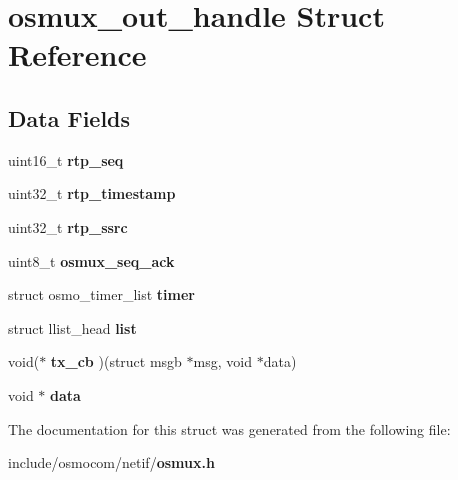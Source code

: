\section{osmux\+\_\+out\+\_\+handle Struct Reference}
\label{structosmux__out__handle}
\subsection*{Data Fields}
\begin{DoxyCompactItemize}
\item 
uint16\+\_\+t {\bfseries rtp\+\_\+seq}\label{structosmux__out__handle_aee1bdb3d46a66d0b153a423f53a83880}

\item 
uint32\+\_\+t {\bfseries rtp\+\_\+timestamp}\label{structosmux__out__handle_a15fd8367e4a22c0f47a5b331efb6d7e5}

\item 
uint32\+\_\+t {\bfseries rtp\+\_\+ssrc}\label{structosmux__out__handle_a3096fae9b4391ff0754406c8e4545653}

\item 
uint8\+\_\+t {\bfseries osmux\+\_\+seq\+\_\+ack}\label{structosmux__out__handle_aa44bc279d52ce909c02c3f26c104fe39}

\item 
struct osmo\+\_\+timer\+\_\+list {\bfseries timer}\label{structosmux__out__handle_aeb2a82bcffb2e94fe238779d7bfe24af}

\item 
struct llist\+\_\+head {\bfseries list}\label{structosmux__out__handle_a0127194adc4acf055bfb5bf656175cea}

\item 
void($\ast$ {\bfseries tx\+\_\+cb} )(struct msgb $\ast$msg, void $\ast$data)\label{structosmux__out__handle_a6995e0db09de16551070a1a6e4421f82}

\item 
void $\ast$ {\bfseries data}\label{structosmux__out__handle_af25716a02d38f2d33c922cfbe0c170f2}

\end{DoxyCompactItemize}


The documentation for this struct was generated from the following file\+:\begin{DoxyCompactItemize}
\item 
include/osmocom/netif/{\bf osmux.\+h}\end{DoxyCompactItemize}
